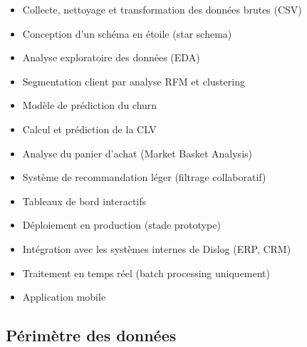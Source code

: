 \documentclass[11pt,a4paper]{article}
\begin{document}
\begin{minipage}[t]{0.48\textwidth}
\begin{successbox}
\begin{itemize}[noitemsep, leftmargin=1.2em]
  \item Collecte, nettoyage et transformation des données brutes (CSV)
  \item Conception d'un schéma en étoile (star schema)
  \item Analyse exploratoire des données (EDA)
  \item Segmentation client par analyse RFM et clustering
  \item Modèle de prédiction du churn
  \item Calcul et prédiction de la CLV
  \item Analyse du panier d'achat (Market Basket Analysis)
  \item Système de recommandation léger (filtrage collaboratif)
  \item Tableaux de bord interactifs
\end{itemize}
\end{successbox}
\end{minipage}
\hfill
\begin{minipage}[t]{0.48\textwidth}
\begin{tcolorbox}[
  enhanced, breakable,
  colback=dangerred!5, colframe=dangerred!50, boxrule=0.6pt, arc=3pt,
  top=6pt, bottom=6pt, left=10pt, right=10pt,
  fonttitle=\bfseries\small\color{dangerred},
  title={\faIcon{times-circle}\hspace{6pt}Exclus du périmètre}
]
\begin{itemize}[noitemsep, leftmargin=1.2em]
  \item Déploiement en production (stade prototype)
  \item Intégration avec les systèmes internes de Dislog (ERP, CRM)
  \item Traitement en temps réel (batch processing uniquement)
  \item Application mobile
\end{itemize}
\end{tcolorbox}
\end{minipage}

\subsection{Périmètre des données}
\end{document}
